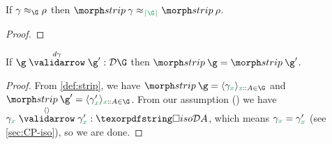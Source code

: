 \documentclass{rntz}\usepackage{fantasy}%
\begin{document}

\begin{lemma}\label{lem:strip-approx}
  If $\gamma \approx_\G \rho$ then $\strip\<\gamma \approx_{\stripcxd\G}
  \strip\<\rho$.
\end{lemma}
\begin{proof}
  \XXX
\end{proof}


\begin{lemma}\label{lem:strip-equal}
  If $\vld{\dgamma}{\g}{\g'} : \incdens\G$ then $\strip\<\g = \strip\<\g'$.
\end{lemma}
\begin{proof}
  From \cref{def:strip}, we have \(\strip\<\g = \tuple{\gamma_{\dvar x}}_{\hd x
    A \in \G}\) and \(\strip\<\g' = \tuple{\gamma'_{\dvar x}}_{\hd x A \in
    \G}\). From our assumption () we have $\vld{\tuple{}}{\gamma_{\dvar x}}{\gamma'_{\dvar
      x}} : \isof{\incdens A}$, which means $\gamma_{\dvar x} = \gamma'_{\dvar
    x}$ (see \cref{sec:CP-iso}), so we are done.
\end{proof}
\end{document}
